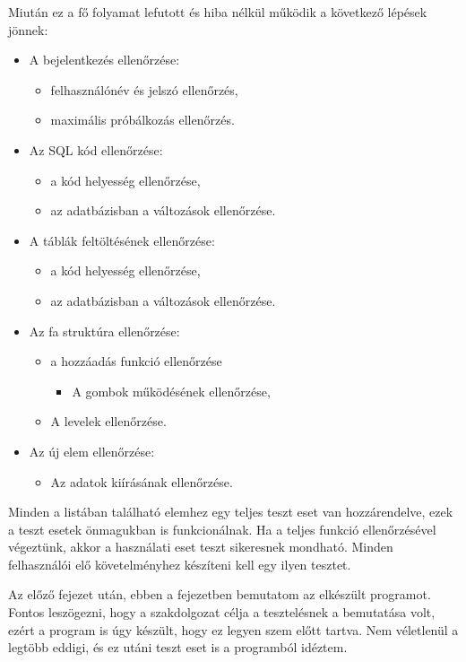 Miután ez a fő folyamat lefutott és hiba nélkül működik a következő lépések jönnek:
\begin{itemize}
	\item A bejelentkezés ellenőrzése:
		\begin{itemize}
			\item felhasználónév és jelszó ellenőrzés,
			\item maximális próbálkozás ellenőrzés.
		\end{itemize}
	\item Az SQL kód ellenőrzése:
		\begin{itemize}
			\item a kód helyesség ellenőrzése,
			\item az adatbázisban a változások ellenőrzése.
		\end{itemize}
	\item A táblák feltöltésének ellenőrzése:
		\begin{itemize}
			\item a kód helyesség ellenőrzése,
			\item az adatbázisban a változások ellenőrzése.
		\end{itemize}
	\item Az fa struktúra ellenőrzése:
		\begin{itemize}
			\item a hozzáadás funkció ellenőrzése
				\begin{itemize}
					\item A gombok működésének ellenőrzése,
				\end{itemize}
			\item A levelek ellenőrzése.
		\end{itemize}
	\item Az új elem ellenőrzése:
		\begin{itemize}
			\item Az adatok kiírásának ellenőrzése.
		\end{itemize}
\end{itemize}
Minden a listában található elemhez egy teljes teszt eset van hozzárendelve, ezek a teszt esetek önmagukban is funkcionálnak. 
Ha a teljes funkció ellenőrzésével végeztünk, akkor a használati eset teszt sikeresnek mondható. Minden felhasználói elő követelményhez készíteni kell egy ilyen tesztet.



Az előző fejezet után, ebben a fejezetben bemutatom az elkészült programot. Fontos leszögezni, hogy a szakdolgozat célja a tesztelésnek a bemutatása volt, ezért a program is úgy készült, hogy ez legyen szem előtt tartva. Nem véletlenül a legtöbb eddigi, és ez utáni teszt eset is a programból idéztem.

